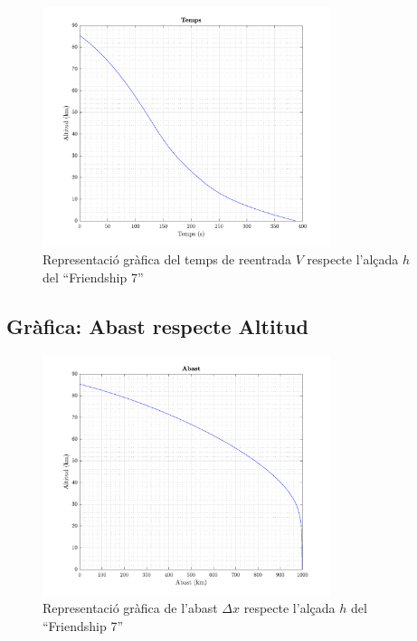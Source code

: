 \begin{figure}[h]
    \centering
    \includegraphics[width=0.75\textwidth]{imagenes/09_mercury_graficas/temps.pdf}
    \caption{Representació gràfica del temps de reentrada $V$ respecte l'alçada $h$ del ``Friendship 7''}
    \label{fig:temps_merc}
\end{figure}


\newpage
\subsection{Gràfica: Abast respecte Altitud}

\begin{figure}[h]
    \centering
    \includegraphics[width=0.75\textwidth]{imagenes/09_mercury_graficas/abast.pdf}
    \caption{Representació gràfica de l'abast $\Delta x$ respecte l'alçada $h$ del ``Friendship 7''}
    \label{fig:abas_merc}
\end{figure}


\newpage
